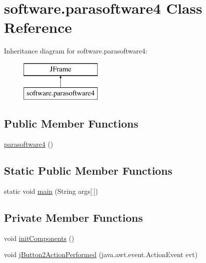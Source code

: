 \hypertarget{classsoftware_1_1parasoftware4}{}\section{software.\+parasoftware4 Class Reference}
\label{classsoftware_1_1parasoftware4}
Inheritance diagram for software.\+parasoftware4\+:\begin{figure}[H]
\begin{center}
\leavevmode
\includegraphics[height=2.000000cm]{classsoftware_1_1parasoftware4}
\end{center}
\end{figure}
\subsection*{Public Member Functions}
\begin{DoxyCompactItemize}
\item 
\mbox{\hyperlink{classsoftware_1_1parasoftware4_a045ccbe7058acf5332dae140a7c6485d}{parasoftware4}} ()
\end{DoxyCompactItemize}
\subsection*{Static Public Member Functions}
\begin{DoxyCompactItemize}
\item 
static void \mbox{\hyperlink{classsoftware_1_1parasoftware4_a0d3e015a84b29f2c3a169f951e2e3452}{main}} (String args\mbox{[}$\,$\mbox{]})
\end{DoxyCompactItemize}
\subsection*{Private Member Functions}
\begin{DoxyCompactItemize}
\item 
void \mbox{\hyperlink{classsoftware_1_1parasoftware4_aa234754657f1e30dfbe2fcb910bc7d0a}{init\+Components}} ()
\item 
void \mbox{\hyperlink{classsoftware_1_1parasoftware4_afcfd8a8b7284cb03ceb13bee312f4648}{j\+Button2\+Action\+Performed}} (java.\+awt.\+event.\+Action\+Event evt)
\end{DoxyCompactItemize}

